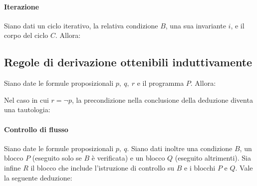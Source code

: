 \paragraph{Iterazione}
Siano dati un ciclo iterativo, la relativa condizione $B$, una sua invariante $i$, e il corpo del ciclo $C$. Allora:

\begin{prooftree}
	
\end{prooftree}

\subsection{Regole di derivazione ottenibili induttivamente}
Siano date le formule proposizionali $p,\ q,\ r$ e il programma $P$. Allora:	

\begin{prooftree}
\end{prooftree}

Nel caso in cui $r = \neg p$, la precondizione nella conclusione della deduzione diventa una tautologia:

\begin{prooftree}
\end{prooftree}

\paragraph{Controllo di flusso}
Siano date le formule proposizionali $p,\ q$. Siano dati inoltre una condizione $B$, un blocco $P$ (eseguito solo se $B$ \`e verificata) e un blocco $Q$ (eseguito altrimenti). Sia infine $R$ il blocco che include l'istruzione di controllo su $B$ e i blocchi $ P $ e $Q$. Vale la seguente deduzione:

\begin{prooftree}
\end{prooftree}
\newpage
